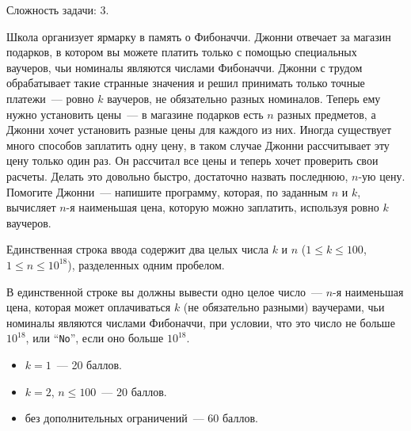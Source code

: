 
\Legend
Сложность задачи: $3$.

Школа организует ярмарку в память о Фибоначчи. Джонни отвечает за магазин подарков, в котором вы можете
платить только с помощью специальных ваучеров, чьи номиналы являются числами Фибоначчи. Джонни с трудом обрабатывает
такие странные значения и решил принимать только точные платежи~--- ровно $k$ ваучеров, не обязательно
разных номиналов. Теперь ему нужно установить цены~--- в магазине подарков есть $n$ разных предметов, а Джонни хочет
установить разные цены для каждого из них. Иногда существует много способов заплатить одну цену, в таком случае Джонни
рассчитывает эту цену только один раз. Он рассчитал все цены и теперь хочет проверить свои расчеты. Делать это довольно
быстро, достаточно назвать последнюю, $n$-ую цену. Помогите Джонни~--- напишите программу, которая, по заданным $n$ и $k$,
вычисляет $n$-я наименьшая цена, которую можно заплатить, используя ровно $k$ ваучеров.

\Input
Единственная строка ввода содержит два целых числа $k$ и $n$ ($1 \le k \le 100$, $1 \le n \le 10^{18}$), разделенных одним пробелом.

\Output
В единственной строке вы должны вывести одно целое число~--- $n$-я наименьшая цена, которая может
оплачиваться $k$ (не обязательно разными) ваучерами, чьи номиналы являются числами Фибоначчи, при условии, что это
число не больше $10^{18}$, или ``\texttt{No}'', если оно больше $10^{18}$.

\Samples
\BeginTests
\EndTests

\Scoring
\begin{itemize}
	\item $k = 1$~--- 20 баллов.
	\item $k = 2$, $n \le 100$~--- 20 баллов.
	\item без дополнительных ограничений~--- 60 баллов.
\end{itemize}

\EndProblem

